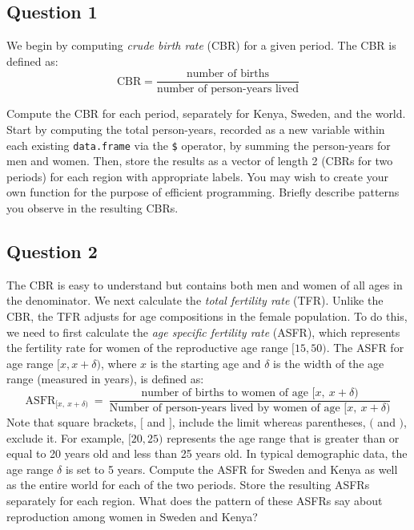 \documentclass[]{article}
\begin{document}
\subsection{Question 1}\label{question-1}

We begin by computing \emph{crude birth rate} (CBR) for a given period.
The CBR is defined as: \[ 
    \text{CBR} 
     =  \frac{\text{number of births}}{\text{number of person-years lived}}
  \]

Compute the CBR for each period, separately for Kenya, Sweden, and the
world. Start by computing the total person-years, recorded as a new
variable within each existing \texttt{data.frame} via the \texttt{\$}
operator, by summing the person-years for men and women. Then, store the
results as a vector of length 2 (CBRs for two periods) for each region
with appropriate labels. You may wish to create your own function for
the purpose of efficient programming. Briefly describe patterns you
observe in the resulting CBRs.

\subsection{Question 2}\label{question-2}

The CBR is easy to understand but contains both men and women of all
ages in the denominator. We next calculate the \emph{total fertility
rate} (TFR). Unlike the CBR, the TFR adjusts for age compositions in the
female population. To do this, we need to first calculate the \emph{age
specific fertility rate} (ASFR), which represents the fertility rate for
women of the reproductive age range $[15, 50)$. The ASFR for age range
$[x, x+\delta)$, where $x$ is the starting age and $\delta$ is the width
of the age range (measured in years), is defined as: \[
    \text{ASFR}_{[x,\ x+\delta)} 
    \ = \ \frac{\text{number of births to women of age $[x,\ x+\delta)$}}{\text{Number of person-years lived by women of age $[x,\ x+\delta)$}}
  \] Note that square brackets, $[$ and $]$, include the limit whereas
parentheses, $($ and $)$, exclude it. For example, $[20, 25)$ represents
the age range that is greater than or equal to 20 years old and less
than 25 years old. In typical demographic data, the age range $\delta$
is set to 5 years. Compute the ASFR for Sweden and Kenya as well as the
entire world for each of the two periods. Store the resulting ASFRs
separately for each region. What does the pattern of these ASFRs say
about reproduction among women in Sweden and Kenya?
\end{document}

